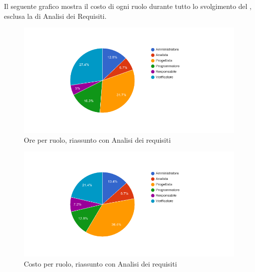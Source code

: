 Il seguente grafico mostra il costo di ogni ruolo durante tutto lo svolgimento del , esclusa la  di Analisi dei Requisiti.

\begin{figure}[H]
  \begin{center}
    \includegraphics[width=15cm]{res/img/prospettoEconomico/orePerRuoloRiassuntoConAnalisi.png}
  \caption{Ore per ruolo, riassunto  con Analisi dei requisiti}
  \end{center} 
\end{figure}  

\begin{figure}[H]
  \begin{center}
    \includegraphics[width=15cm]{res/img/prospettoEconomico/costoPerRuoloRiassuntoConAnalisi.png}
  \caption{Costo per ruolo, riassunto  con Analisi dei requisiti}
  \end{center} 
\end{figure}  


